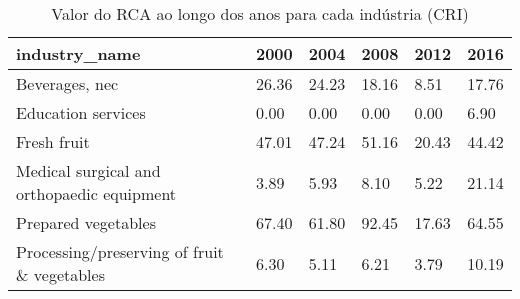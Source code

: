 \begin{table}
\centering
\caption{Valor do RCA ao longo dos anos para cada indústria (CRI)}
\begin{tabular}{p{6cm}p{1.5cm}p{1.5cm}p{1.5cm}p{1.5cm}p{1.5cm}}
\toprule
                              industry\_name &  2000 &  2004 &  2008 &  2012 &  2016 \\
\midrule
                             Beverages, nec & 26.36 & 24.23 & 18.16 &  8.51 & 17.76 \\
                         Education services &  0.00 &  0.00 &  0.00 &  0.00 &  6.90 \\
                                Fresh fruit & 47.01 & 47.24 & 51.16 & 20.43 & 44.42 \\
 Medical surgical and orthopaedic equipment &  3.89 &  5.93 &  8.10 &  5.22 & 21.14 \\
                        Prepared vegetables & 67.40 & 61.80 & 92.45 & 17.63 & 64.55 \\
Processing/preserving of fruit \& vegetables &  6.30 &  5.11 &  6.21 &  3.79 & 10.19 \\
\bottomrule
\end{tabular}
\end{table}
